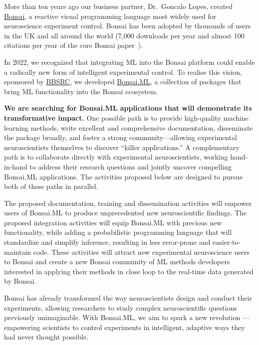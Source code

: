 More than ten years ago our business partner, Dr.~Goncalo Lopes, created
\href{https://bonsai-rx.org/}{Bonsai}, a reactive visual programming
language most widely used for neuroscience experiment control.
%
Bonsai has been adopted by thousands of users in the UK and all around the
world (7,000 downloads per year and almost 100 citations per year of the core Bonsai
paper~\citep{lopesEtAl15}).

In 2022, we recognized that integrating ML into the Bonsai platform could
enable a radically new form of intelligent experimental control.
%
To realise this vision, sponsored by
\href{https://gow.bbsrc.ukri.org/grants/AwardDetails.aspx?FundingReference=BB\%2FW019132\%2F1}{BBSRC},
we developed \href{https://bonsai-rx.org/machinelearning}{Bonsai.ML}, a collection of packages
that bring ML functionality into the Bonsai ecosystem.

\textbf{We are searching for Bonsai.ML applications that will demonstrate its
transformative impact.}
%
One possible path is to provide high-quality machine learning methods, write
excellent and comprehensive documentation, disseminate the package broadly, and
foster a strong community—allowing experimental neuroscientists themselves to
discover “killer applications.”
%
A complementary path is to collaborate directly with experimental
neuroscientists, working hand-in-hand to address their research questions and
jointly uncover compelling Bonsai.ML applications.
%
The activities proposed below are designed to pursue both of these paths in
parallel.

The proposed documentation, training and dissemination activities will empower
users of Bonsai.ML to produce unprecedented new neuroscientific findings. The
proposed integration activities will equip Bonsai.ML with precious new
functionality, while adding a probabilistic programming language that will
standardize and simplify inference, resulting in less error-prone and
easier-to-maintain code.
%
These activities will attract new experimental neuroscience users to Bonsai and
create a new Bonsai community of ML methods developers interested in applying
their methods in close loop to the real-time data generated by Bonsai.

Bonsai has already transformed the way neuroscientists design and conduct their experiments, allowing researchers to study complex neuroscientific questions previously unimaginable. With Bonsai.ML, we aim
to spark a new revolution — empowering scientists to control experiments in
intelligent, adaptive ways they had never thought possible.
